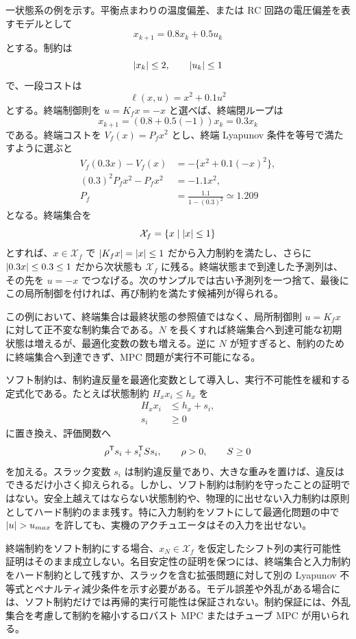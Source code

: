 一状態系の例を示す。平衡点まわりの温度偏差、または RC 回路の電圧偏差を表すモデルとして
\begin{equation}
  x_{k+1}=0.8x_k+0.5u_k
\end{equation}
とする。制約は
\begin{equation}
  \left|x_k\right|\le2,
  \qquad
  \left|u_k\right|\le1
\end{equation}
で、一段コストは
\begin{equation}
  \ell(x,u)=x^2+0.1u^2
\end{equation}
とする。終端制御則を $u=K_fx=-x$ と選べば、終端閉ループは
\begin{equation}
  x_{k+1}=(0.8+0.5(-1))x_k=0.3x_k
\end{equation}
である。終端コストを $V_f(x)=P_fx^2$ とし、終端 Lyapunov 条件を等号で満たすように選ぶと
\begin{align}
  V_f(0.3x)-V_f(x)&=-\{x^2+0.1(-x)^2\},\\
  (0.3)^2P_fx^2-P_fx^2&=-1.1x^2,\\
  P_f&=\frac{1.1}{1-(0.3)^2}\simeq1.209
\end{align}
となる。終端集合を
\begin{equation}
  \mathcal{X}_f=\{x\mid \left|x\right|\le1\}
\end{equation}
とすれば、$x\in\mathcal{X}_f$ で $\left|K_fx\right|=\left|x\right|\le1$ だから入力制約を満たし、さらに $\left|0.3x\right|\le0.3\le1$ だから次状態も $\mathcal{X}_f$ に残る。終端状態まで到達した予測列は、その先を $u=-x$ でつなげる。次のサンプルでは古い予測列を一つ捨て、最後にこの局所制御を付ければ、再び制約を満たす候補列が得られる。

この例において、終端集合は最終状態の参照値ではなく、局所制御則 $u=K_fx$ に対して正不変な制約集合である。$N$ を長くすれば終端集合へ到達可能な初期状態は増えるが、最適化変数の数も増える。逆に $N$ が短すぎると、制約のために終端集合へ到達できず、MPC 問題が実行不可能になる。

ソフト制約は、制約違反量を最適化変数として導入し、実行不可能性を緩和する定式化である。たとえば状態制約 $H_xx_i\le h_x$ を
\begin{align}
  H_xx_i&\le h_x+s_i,\\
  s_i&\ge0
\end{align}
に置き換え、評価関数へ
\begin{equation}
  \rho^{\mathsf{T}} s_i+s_i^{\mathsf{T}} S s_i,
  \qquad \rho>0,
  \qquad S\ge0
\end{equation}
を加える。スラック変数 $s_i$ は制約違反量であり、大きな重みを置けば、違反はできるだけ小さく抑えられる。しかし、ソフト制約は制約を守ったことの証明ではない。安全上越えてはならない状態制約や、物理的に出せない入力制約は原則としてハード制約のまま残す。特に入力制約をソフトにして最適化問題の中で $\abs{u}>u_{max}$ を許しても、実機のアクチュエータはその入力を出せない。

終端制約をソフト制約にする場合、$x_N\in\mathcal{X}_f$ を仮定したシフト列の実行可能性証明はそのまま成立しない。名目安定性の証明を保つには、終端集合と入力制約をハード制約として残すか、スラックを含む拡張問題に対して別の Lyapunov 不等式とペナルティ減少条件を示す必要がある。モデル誤差や外乱がある場合には、ソフト制約だけでは再帰的実行可能性は保証されない。制約保証には、外乱集合を考慮して制約を縮小するロバスト MPC またはチューブ MPC が用いられる。
